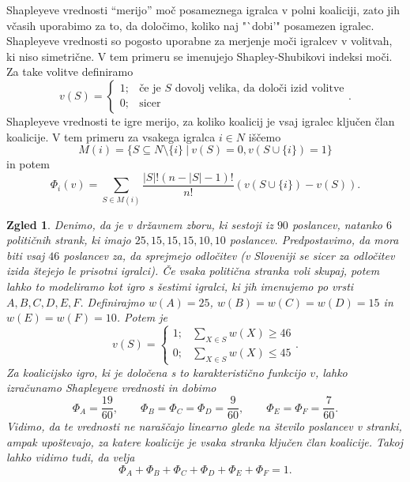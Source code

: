 \documentclass[10pt, a4paper]{article}
\newtheorem{zgled}[izr]{Zgled}
\begin{document}
Shapleyeve vrednosti "`merijo"' moč posameznega igralca v polni koaliciji, zato jih včasih uporabimo za to,
da določimo, koliko naj "`dobi'" posamezen igralec.
Shapleyeve vrednosti so pogosto uporabne za merjenje moči  
igralcev v volitvah, ki niso simetrične.
V tem primeru se imenujejo Shapley-Shubikovi indeksi moči.
Za take volitve definiramo 
$$v(S) = \begin{cases}
  1;& \text{če je $S$ dovolj velika, da določi izid volitve}\\
  0;& \text{sicer}
\end{cases}.$$
Shapleyeve vrednosti te igre merijo, za koliko koalicij je vsaj igralec ključen član koalicije.
V tem primeru za vsakega igralca $i \in N$ iščemo 
$$M(i) = \{S \subseteq N \setminus \{i\}\ |\ v(S) = 0, v(S \cup \{i\}) = 1\}$$
in potem 
$$\Phi_i (v) = \sum_{S \in M(i)} \frac{|S|! (n - |S| - 1)!}{n!} (v(S \cup \{i\}) - v(S)).$$
\begin{zgled}
  Denimo, da je v državnem zboru, ki sestoji iz $90$ poslancev,
  natanko $6$ političnih strank, ki imajo $25, 15, 15, 15, 10, 10$ poslancev.
  Predpostavimo, da mora biti vsaj $46$ poslancev za, da sprejmejo odločitev 
  (v Sloveniji se sicer za odločitev izida štejejo le prisotni igralci).
  Če vsaka politična stranka voli skupaj, potem lahko to modeliramo kot igro s šestimi igralci,
  ki jih imenujemo po vrsti $A, B, C, D, E, F$.
  Definirajmo $w(A) = 25$, $w(B) = w(C) = w(D) = 15$ in $w(E) = w(F) = 10$.
  Potem je 
  $$v(S) = \begin{cases}
    1;& \sum_{X \in S} w(X) \geq 46\\
    0;& \sum_{X \in S} w(X) \leq 45
  \end{cases}.$$
  Za koalicijsko igro, ki je določena s to karakteristično funkcijo $v$,
  lahko izračunamo Shapleyeve vrednosti in dobimo 
  $$\Phi_A = \frac{19}{60},\qquad \Phi_B = \Phi_C = \Phi_D = \frac{9}{60},\qquad \Phi_E = \Phi_F = \frac{7}{60}.$$
  Vidimo, da te vrednosti ne naraščajo linearno glede na število poslancev v stranki, ampak upoštevajo,
  za katere koalicije je vsaka stranka ključen član koalicije.
  Takoj lahko vidimo tudi, da velja 
  $$\Phi_A + \Phi_B + \Phi_C + \Phi_D + \Phi_E + \Phi_F = 1.$$
\end{zgled}
\end{document}
